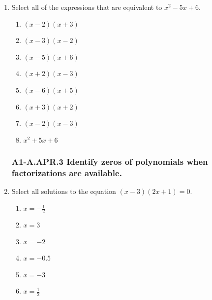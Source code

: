 \documentclass[12pt, twoside]{article}
\begin{document}
\begin{enumerate}
\item Select all of the expressions that are equivalent to $x^2-5x+6$.
    \begin{multicols}{2}
    \begin{enumerate}
        \item $(x-2)(x+3)$
        \item $(x-3)(x-2)$ 
        \item $(x-5)(x+6)$ 
        \item $(x+2)(x-3)$ 
        \item $(x-6)(x+5)$
        \item $(x+3)(x+2)$ 
        \item $(x-2)(x-3)$
        \item $x^2+5x+6$
    \end{enumerate} 
    \end{multicols}
    \vspace{0.25cm}

\newpage
\subsubsection*{A1-A.APR.3 Identify zeros of polynomials when factorizations are available.}
\item Select all solutions to the equation $(x-3)(2x+1)=0$.
    \begin{multicols}{2}
    \begin{enumerate}
        \item $x=-\frac{1}{2}$
        \item $x=3$
        \item $x=-2$
        \item $x=-0.5$
        \item $x=-3$
        \item $x=\frac{1}{2}$
    \end{enumerate}
    \end{multicols}
    \vspace{0.25cm}


\end{enumerate}
\end{document}
